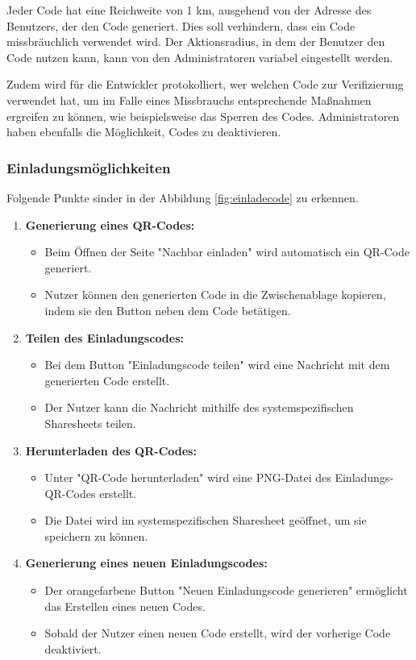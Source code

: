 Jeder Code hat eine Reichweite von 1 km, ausgehend von der Adresse des Benutzers, der den Code generiert. Dies soll verhindern, dass ein Code missbräuchlich verwendet wird. Der Aktionsradius, in dem der Benutzer den Code nutzen kann, kann von den Administratoren variabel eingestellt werden.

Zudem wird für die Entwickler protokolliert, wer welchen
Code zur Verifizierung verwendet hat, um im Falle eines
Missbrauchs entsprechende Maßnahmen ergreifen zu können, wie
beispielsweise das Sperren des Codes. Administratoren haben
ebenfalls die Möglichkeit, Codes zu deaktivieren.
\subsubsection{Einladungsmöglichkeiten}


Folgende Punkte sinder in der Abbildung
\ref{fig:einladecode} zu erkennen.


\begin{enumerate}[label=\arabic*.]
  \item \textbf{Generierung eines QR-Codes:}
        \begin{itemize}
          \item Beim Öffnen der Seite "Nachbar einladen" wird automatisch ein QR-Code generiert.
          \item Nutzer können den generierten Code in die Zwischenablage kopieren, indem sie den Button neben dem Code betätigen.
        \end{itemize}

  \item \textbf{Teilen des Einladungscodes:}
        \begin{itemize}
          \item Bei dem Button "Einladungscode teilen" wird eine Nachricht mit dem generierten Code erstellt.
          \item Der Nutzer kann die Nachricht mithilfe des systemspezifischen Sharesheets teilen.
        \end{itemize}

  \item \textbf{Herunterladen des QR-Codes:}
        \begin{itemize}
          \item Unter "QR-Code herunterladen" wird eine PNG-Datei des Einladungs-QR-Codes erstellt.
          \item Die Datei wird im systemspezifischen Sharesheet geöffnet, um sie speichern zu können.
        \end{itemize}

  \item \textbf{Generierung eines neuen Einladungscodes:}
        \begin{itemize}
          \item Der orangefarbene Button "Neuen Einladungscode generieren" ermöglicht das Erstellen eines neuen Codes.
          \item Sobald der Nutzer einen neuen Code erstellt, wird der vorherige Code deaktiviert.
        \end{itemize}
\end{enumerate}

